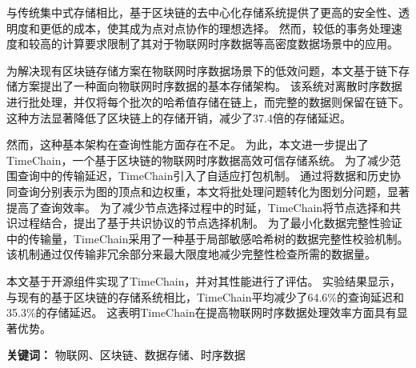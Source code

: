 \cleardoublepage
{}

与传统集中式存储相比，基于区块链的去中心化存储系统提供了更高的安全性、透明度和更低的成本，使其成为点对点协作的理想选择。
然而，较低的事务处理速度和较高的计算要求限制了其对于物联网时序数据等高密度数据场景中的应用。

为解决现有区块链存储方案在物联网时序数据场景下的低效问题，本文基于链下存储方案提出了一种面向物联网时序数据的基本存储架构。
该系统对离散时序数据进行批处理，并仅将每个批次的哈希值存储在链上，而完整的数据则保留在链下。
这种方法显著降低了区块链上的存储开销，减少了37.4倍的存储延迟。

然而，这种基本架构在查询性能方面存在不足。
为此，本文进一步提出了TimeChain，一个基于区块链的物联网时序数据高效可信存储系统。
为了减少范围查询中的传输延迟，TimeChain引入了自适应打包机制。
通过将数据和历史协同查询分别表示为图的顶点和边权重，本文将批处理问题转化为图划分问题，显著提高了查询效率。
为了减少节点选择过程中的时延，TimeChain将节点选择和共识过程结合，提出了基于共识协议的节点选择机制。
为了最小化数据完整性验证中的传输量，TimeChain采用了一种基于局部敏感哈希树的数据完整性校验机制。
该机制通过仅传输非冗余部分来最大限度地减少完整性检查所需的数据量。

本文基于开源组件实现了TimeChain，并对其性能进行了评估。
实验结果显示，与现有的基于区块链的存储系统相比，TimeChain平均减少了64.6\%的查询延迟和35.3\%的存储延迟。
这表明TimeChain在提高物联网时序数据处理效率方面具有显著优势。

\textbf{关键词：} 物联网、区块链、数据存储、时序数据